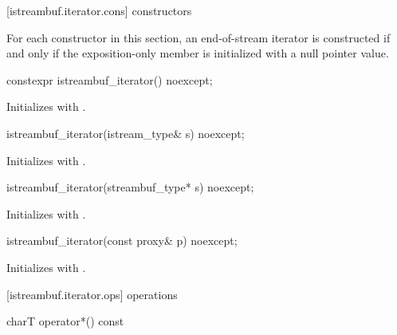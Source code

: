[istreambuf.iterator.cons]{ constructors}

\pnum
For each  constructor in this section,
an end-of-stream iterator is constructed if and only if
the exposition-only member  is initialized with a null pointer value.


%
\begin{itemdecl}
constexpr istreambuf_iterator() noexcept;
\end{itemdecl}

\begin{itemdescr}
\pnum
\effects
Initializes  with .
\end{itemdescr}


%
\begin{itemdecl}
istreambuf_iterator(istream_type& s) noexcept;
\end{itemdecl}

\begin{itemdescr}
\pnum
\effects
Initializes  with .
\end{itemdescr}


%
\begin{itemdecl}
istreambuf_iterator(streambuf_type* s) noexcept;
\end{itemdecl}

\begin{itemdescr}
\pnum
\effects
Initializes  with .
\end{itemdescr}


%
\begin{itemdecl}
istreambuf_iterator(const proxy& p) noexcept;
\end{itemdecl}

\begin{itemdescr}
\pnum
\effects
Initializes  with .
\end{itemdescr}

[istreambuf.iterator.ops]{ operations}

%
\begin{itemdecl}
charT operator*() const
\end{itemdecl}

